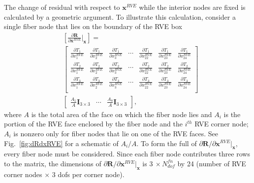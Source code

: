 The change of residual with respect to $\pmb{x}^{RVE}$ while the interior nodes are fixed is calculated by a geometric argument. To illustrate this calculation, consider a single fiber node that lies on the boundary of the RVE box 
%
\begin{align}
&\left [\frac{\partial \pmb{R}}{\partial \pmb{x}^{RVE}}\bigg |_{\pmb{x}}\right] = \nonumber\\
%
&\begin{bmatrix} 
\frac{\partial T_1}{\partial x_1^{RVE}} & \frac{\partial T_1}{\partial x_2^{RVE}} & \frac{\partial T_1}{\partial x_3^{RVE}} & \cdots & \frac{\partial T_1}{\partial x_{22}^{RVE}} & \frac{\partial T_1}{\partial x_{23}^{RVE}} & \frac{\partial T_1}{\partial x_{24}^{RVE}} \\
%
\frac{\partial T_2}{\partial x_1^{RVE}} & \frac{\partial T_2}{\partial x_2^{RVE}} & \frac{\partial T_2}{\partial x_3^{RVE}} & \cdots & \frac{\partial T_2}{\partial x_{22}^{RVE}} & \frac{\partial T_2}{\partial x_{23}^{RVE}} & \frac{\partial T_2}{\partial x_{24}^{RVE}} \\
%
\frac{\partial T_3}{\partial x_1^{RVE}} & \frac{\partial T_3}{\partial x_2^{RVE}} & \frac{\partial T_3}{\partial x_3^{RVE}} & \cdots & \frac{\partial T_3}{\partial x_{22}^{RVE}} & \frac{\partial T_3}{\partial x_{23}^{RVE}} & \frac{\partial T_3}{\partial x_{24}^{RVE}} \\
\end{bmatrix} \nonumber\\
%
& \begin{bmatrix}
\frac{A_1}{A}\pmb{I}_{3\times3} & \cdots & \frac{A_8}{A}\pmb{I}_{3\times3}
\end{bmatrix},
\label{eq:dRdxRVE_1node}
\end{align}
%
where $A$ is the total area of the face on which the fiber node lies and $A_i$ is the portion of the RVE face enclosed by the fiber node and the $i^{th}$ RVE corner node; $A_i$ is nonzero only for fiber nodes that lie on one of the RVE faces. See Fig.\ \ref{fig:dRdxRVE} for a schematic of $A_i/A$. To form the full of $\partial \pmb{R}/\partial \pmb{x}^{RVE} |_{\pmb{x}}$, every fiber node must be considered. Since each fiber node contributes three rows to the matrix, the dimensions of $\partial \pmb{R}/\partial \pmb{x}^{RVE} |_{\pmb{x}}$ is $3 \ \times N_{dof}^{fn}$ by 24 (number of RVE corner nodes $\times$ 3 dofs per corner node).
%
